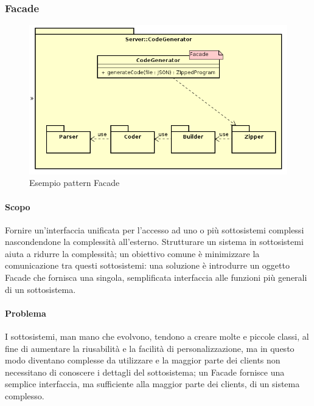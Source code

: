\documentclass[../PianoDiQualifica.tex]{subfiles}
\begin{document}
			\subsubsection{Facade}
				\begin{figure}[H] \label{fig:Facade}
					\centering
					\includegraphics[scale=0.8]{Immagini/FacadeEx.png}
					\caption{Esempio pattern Facade}
				\end{figure}
				\paragraph{Scopo\\}
					Fornire un'interfaccia unificata per l'accesso ad uno o più sottosistemi complessi
					nascondendone la complessità all'esterno. Strutturare un sistema in sottosistemi aiuta a ridurre la complessità; un obiettivo comune è minimizzare la comunicazione tra questi sottosistemi: una soluzione è introdurre un oggetto Facade che fornisca una singola, semplificata interfaccia alle funzioni più generali di un sottosistema.
				\paragraph{Problema\\}
					I sottosistemi, man mano che evolvono, tendono a creare molte e piccole classi, al fine di aumentare la riusabilità e la facilità di personalizzazione, ma in questo modo diventano complesse da utilizzare e la maggior parte dei clients non necessitano di conoscere i dettagli del sottosistema; un Facade fornisce una semplice interfaccia, ma sufficiente alla maggior parte dei clients, di un sistema complesso.
\end{document}
